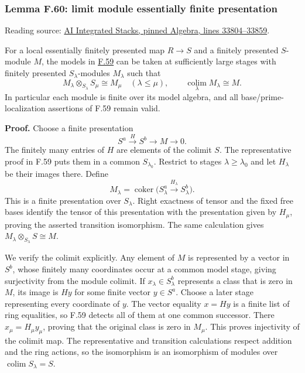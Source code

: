 \documentclass[11pt,a4paper,openany]{report}
\begin{document}
\subsubsection{Lemma F.60: limit module essentially finite presentation}\label{AG-RG-S05-lemma-f.60-limit-module-essentially-finite-presentation}

Reading source: \href{https://github.com/KokunoYumeto/unofficial-stacks-project-ai-drafts/blob/565b10e987aba5969b21145a0833f42d69f96790/algebra.tex\#L33804-L33859}{AI Integrated Stacks, pinned Algebra, lines 33804--33859}.

For a local essentially finitely presented map \(R\to S\) and a finitely presented \(S\)-module \(M\), the models in \hyperref[AG-RG-S05-algebra-lemma-limit-essentially-finite-presentation]{F.59} can be taken at sufficiently large stages with finitely presented \(S_\lambda\)-modules \(M_\lambda\) such that \[M_\lambda\otimes_{S_\lambda}S_\mu\cong M_\mu
\quad(\lambda\leq\mu),\qquad
\operatorname*{colim}_\lambda M_\lambda\cong M.\] In particular each module is finite over its model algebra, and all base/prime-localization assertions of F.59 remain valid.

\textbf{Proof.} Choose a finite presentation \[S^a\xrightarrow{H}S^b\longrightarrow M\longrightarrow0.\] The finitely many entries of \(H\) are elements of the colimit \(S\). The representative proof in F.59 puts them in a common \(S_{\lambda_0}\). Restrict to stages \(\lambda\geq\lambda_0\) and let \(H_\lambda\) be their images there. Define \[M_\lambda=\operatorname{coker}
\bigl(S_\lambda^a\xrightarrow{H_\lambda}S_\lambda^b\bigr).\] This is a finite presentation over \(S_\lambda\). Right exactness of tensor and the fixed free bases identify the tensor of this presentation with the presentation given by \(H_\mu\), proving the asserted transition isomorphism. The same calculation gives \(M_\lambda\otimes_{S_\lambda}S\cong M\).

We verify the colimit explicitly. Any element of \(M\) is represented by a vector in \(S^b\), whose finitely many coordinates occur at a common model stage, giving surjectivity from the module colimit. If \(x_\lambda\in S_\lambda^b\) represents a class that is zero in \(M\), its image is \(Hy\) for some finite vector \(y\in S^a\). Choose a later stage representing every coordinate of \(y\). The vector equality \(x=Hy\) is a finite list of ring equalities, so F.59 detects all of them at one common successor. There \(x_\mu=H_\mu y_\mu\), proving that the original class is zero in \(M_\mu\). This proves injectivity of the colimit map. The representative and transition calculations respect addition and the ring actions, so the isomorphism is an isomorphism of modules over \(\operatorname*{colim}S_\lambda=S\).
\end{document}
